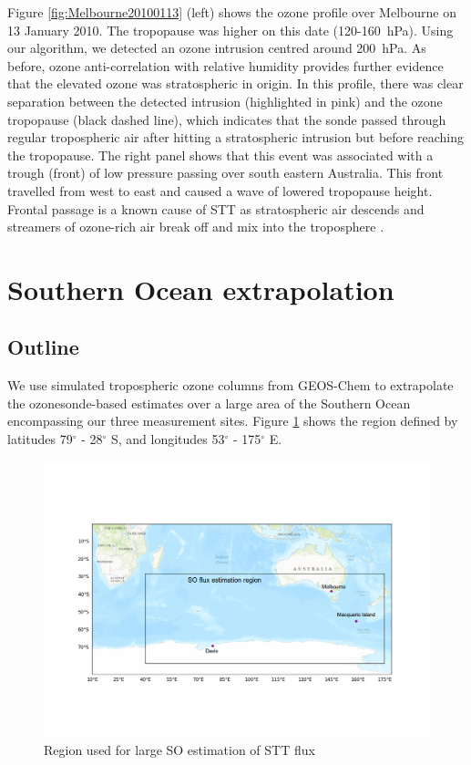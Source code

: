     Figure \ref{fig:Melbourne20100113} (left) shows the ozone profile over Melbourne on 13 January 2010.
    The tropopause was higher on this date (120-160~hPa).
    Using our algorithm, we detected an ozone intrusion centred around 200~hPa.
    As before, ozone anti-correlation with relative humidity provides further evidence that the elevated ozone was stratospheric in origin.
    In this profile, there was clear separation between the detected intrusion (highlighted in pink) and the ozone tropopause (black dashed line), which indicates that the sonde passed through regular tropospheric air after hitting a stratospheric intrusion but before reaching the tropopause.
    The right panel shows that this event was associated with a trough (front) of low pressure passing over south eastern Australia.
    This front travelled from west to east and caused a wave of lowered tropopause height. 
    Frontal passage is a known cause of STT as stratospheric air descends and streamers of ozone-rich air break off and mix into the troposphere \citep{Sprenger2003}.
    
\section{Southern Ocean extrapolation}
  \label{sec:SOExtrapolation}

  \subsection{Outline}
    We use simulated tropospheric ozone columns from GEOS-Chem to extrapolate the ozonesonde-based estimates over a large area of the Southern Ocean encompassing our three measurement sites. 
    Figure \ref{fig:SORegion} shows the region defined by latitudes 79$^{\circ}$ - 28$^{\circ}$ S, and longitudes 53$^{\circ}$ - 175$^{\circ}$ E.
    
    \begin{figure}[t]
      \includegraphics[width=12.0cm]{../figures/OzoneSORegion.png}
      \caption{%
	Region used for large SO estimation of STT flux}
      \label{fig:SORegion}
    \end{figure}
    
